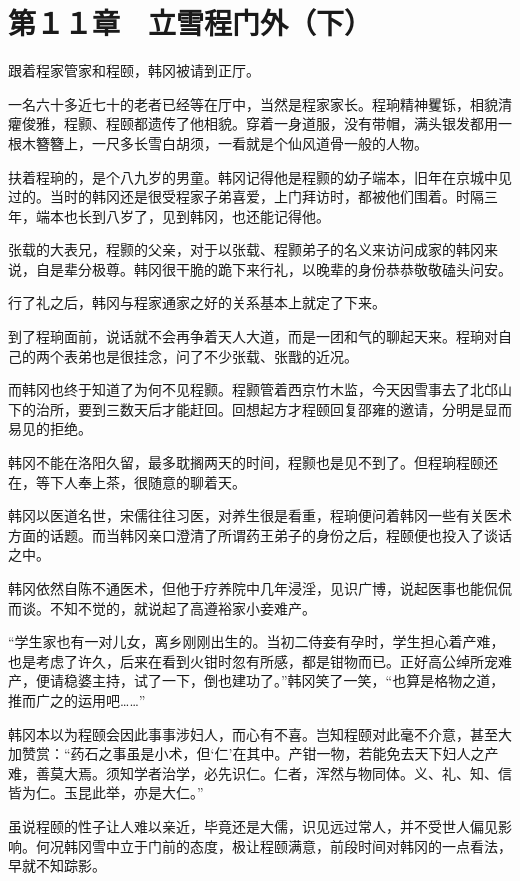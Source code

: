 \section{第１１章　立雪程门外（下） }

跟着程家管家和程颐，韩冈被请到正厅。

一名六十多近七十的老者已经等在厅中，当然是程家家长。程珦精神矍铄，相貌清癯俊雅，程颢、程颐都遗传了他相貌。穿着一身道服，没有带帽，满头银发都用一根木簪簪上，一尺多长雪白胡须，一看就是个仙风道骨一般的人物。

扶着程珦的，是个八九岁的男童。韩冈记得他是程颢的幼子端本，旧年在京城中见过的。当时的韩冈还是很受程家子弟喜爱，上门拜访时，都被他们围着。时隔三年，端本也长到八岁了，见到韩冈，也还能记得他。

张载的大表兄，程颢的父亲，对于以张载、程颢弟子的名义来访问成家的韩冈来说，自是辈分极尊。韩冈很干脆的跪下来行礼，以晚辈的身份恭恭敬敬磕头问安。

行了礼之后，韩冈与程家通家之好的关系基本上就定了下来。

到了程珦面前，说话就不会再争着天人大道，而是一团和气的聊起天来。程珦对自己的两个表弟也是很挂念，问了不少张载、张戬的近况。

而韩冈也终于知道了为何不见程颢。程颢管着西京竹木监，今天因雪事去了北邙山下的治所，要到三数天后才能赶回。回想起方才程颐回复邵雍的邀请，分明是显而易见的拒绝。

韩冈不能在洛阳久留，最多耽搁两天的时间，程颢也是见不到了。但程珦程颐还在，等下人奉上茶，很随意的聊着天。

韩冈以医道名世，宋儒往往习医，对养生很是看重，程珦便问着韩冈一些有关医术方面的话题。而当韩冈亲口澄清了所谓药王弟子的身份之后，程颐便也投入了谈话之中。

韩冈依然自陈不通医术，但他于疗养院中几年浸淫，见识广博，说起医事也能侃侃而谈。不知不觉的，就说起了高遵裕家小妾难产。

“学生家也有一对儿女，离乡刚刚出生的。当初二侍妾有孕时，学生担心着产难，也是考虑了许久，后来在看到火钳时忽有所感，都是钳物而已。正好高公绰所宠难产，便请稳婆主持，试了一下，倒也建功了。”韩冈笑了一笑，“也算是格物之道，推而广之的运用吧……”

韩冈本以为程颐会因此事事涉妇人，而心有不喜。岂知程颐对此毫不介意，甚至大加赞赏：“药石之事虽是小术，但‘仁’在其中。产钳一物，若能免去天下妇人之产难，善莫大焉。须知学者治学，必先识仁。仁者，浑然与物同体。义、礼、知、信皆为仁。玉昆此举，亦是大仁。”

虽说程颐的性子让人难以亲近，毕竟还是大儒，识见远过常人，并不受世人偏见影响。何况韩冈雪中立于门前的态度，极让程颐满意，前段时间对韩冈的一点看法，早就不知踪影。

